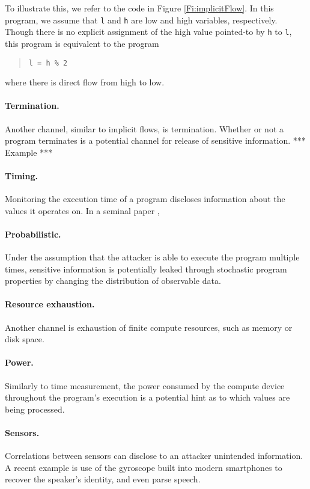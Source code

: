 To illustrate this, we refer to the code in Figure \ref{Fi:implicitFlow}. In this program, we assume that {\tt l} and {\tt h} are low and high variables, respectively. Though there is no explicit assignment of the high value pointed-to by {\tt h} to {\tt l}, this program is equivalent to the program
\begin{quote}
	{\tt l = h \% 2}
\end{quote} 
where there is direct flow from high to low.

\paragraph{Termination.} Another channel, similar to implicit flows, is termination. Whether or not a program terminates is a potential channel for release of sensitive information. *** Example ***

\paragraph{Timing.} Monitoring the execution time of a program discloses information about the values it operates on. In a seminal paper \cite{XXX},

\paragraph{Probabilistic.} Under the assumption that the attacker is able to execute the program multiple times, sensitive information is potentially leaked through stochastic program properties by changing the distribution of observable data. 

\paragraph{Resource exhaustion.} Another channel is exhaustion of finite compute resources, such as memory or disk space. 

\paragraph{Power.} Similarly to time measurement, the power consumed by the compute device throughout the program's execution is a potential hint as to which values are being processed.

\paragraph{Sensors.} Correlations between sensors can disclose to an attacker unintended information. A recent example is use of the gyroscope built into modern smartphones to recover the speaker's identity, and even parse speech.

